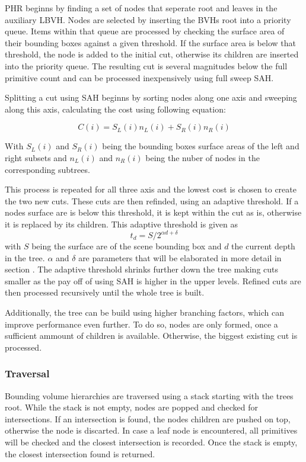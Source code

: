 PHR beginns by finding a set of nodes that seperate root and leaves in the auxiliary LBVH. Nodes are selected by inserting the BVHs root into a priority queue. Items within that queue are processed by checking the surface area of their bounding boxes against a given threshold. If the surface area is below that threshold, the node is added to the initial cut, otherwise its children are inserted into the priority queue. The resulting cut is several magnitudes below the full primitive count and can be processed inexpensively using full sweep SAH.

Splitting a cut using SAH beginns by sorting nodes along one axis and sweeping along this axis, calculating the cost using following equation: %

\[C(i)=S_L(i)n_L(i)+S_R(i)n_R(i)\]

With $S_L(i)$ and $S_R(i)$ being the bounding boxes surface areas of the left and right subsets and $n_L(i)$ and $n_R(i)$ being the nuber of nodes in the corresponding subtrees.

This process is repeated for all three axis and the lowest cost is chosen to create the two new cuts. These cuts are then refinded, using an adaptive threshold. If a nodes surface are is below this threshold, it is kept within the cut as is, otherwise it is replaced by its children. 
This adaptive threshold is given as 
\[t_d = S /{2^{\alpha d + \delta}}\]
with $S$ being the surface are of the scene bounding box and $d$ the current depth in the tree. $\alpha$ and $\delta$ are parameters that will be elaborated in more detail in section .
The adaptive threshold shrinks further down the tree making cuts smaller as the pay off of using SAH is higher in the upper levels. Refined cuts are then processed recursively until the whole tree is built. 

Additionally, the tree can be build using higher branching factors, which can improve performance even further. To do so, nodes are only formed, once a sufficient ammount of children is available. Otherwise, the biggest existing cut is processed. 

\subsubsection{Traversal}
\label{traversal}
Bounding volume hierarchies are traversed using a stack starting with the trees root. While the stack is not empty, nodes are popped and checked for intersections. If an intersection is found, the nodes children are pushed on top, otherwise the node is discarted. In case a leaf node is encountered, all primitives will be checked and the closest intersection is recorded. Once the stack is empty, the closest intersection found is returned. 

